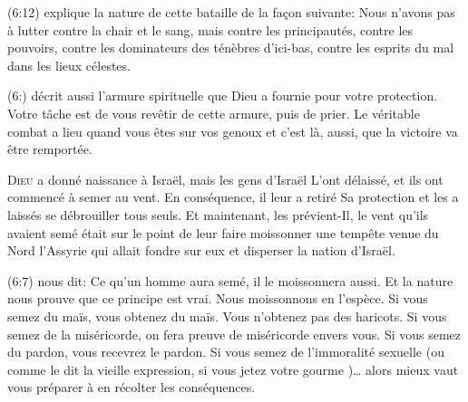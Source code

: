 (6:12) explique la nature de cette bataille
 de la fa\c{c}on suivante: \Og Nous n'avons pas à lutter contre la chair
 et le sang, mais contre les principautés, contre les pouvoirs,
 contre les dominateurs des ténèbres d'ici-bas,
 contre les esprits du mal dans les lieux célestes. \Fg{}

(6:) décrit aussi l'armure spirituelle que Dieu
 a fournie pour votre protection. Votre tâche est de vous revêtir
 de cette armure, puis de prier. Le véritable combat a lieu
 quand vous êtes sur vos genoux et c'est là, aussi,
 que la victoire va être remportée. 

\dvrule







\lettrine{D}{ieu} a donné naissance à Israël, mais les gens d'Israël
 L'ont délaissé, et ils ont commencé à semer au vent.
 En conséquence, il leur a retiré Sa protection et les a laissés 
 se débrouiller tous seuls. Et maintenant, les prévient-Il,
 le vent qu'ils avaient semé était sur le point de leur faire moissonner
 une tempête venue du Nord
 \ocadr l'Assyrie qui allait fondre sur eux et disperser la nation d'Israël. 


(6:7) nous dit: 
 \Og Ce qu'un homme aura semé, il le moissonnera aussi. \Fg{}
 Et la nature nous prouve que ce principe est vrai.
 Nous moissonnons en l'espèce. Si vous semez du maïs, vous obtenez du maïs.
 Vous n'obtenez pas des haricots. Si vous semez de la miséricorde,
 on fera preuve de miséricorde envers vous. Si vous semez du pardon,
 vous recevrez le pardon. Si vous semez de l'immoralité sexuelle
 (ou comme le dit la vieille expression,
 \Og si vous jetez votre gourme \Fg{})\dots{}
 alors mieux vaut vous préparer à en récolter les conséquences. 

